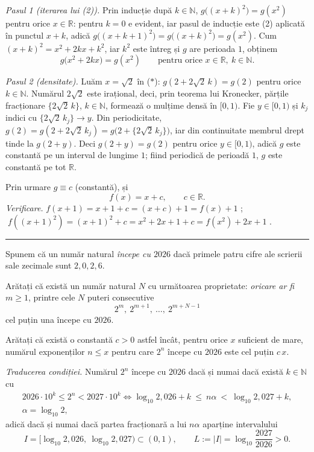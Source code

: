 \emph{Pasul 1 (iterarea lui (2)).} Prin inducție după $k\in\mathbb{N}$, $g\bigl((x+k)^2\bigr)=g(x^2)$ pentru orice $x\in\mathbb{R}$: pentru $k=0$ e evident, iar pasul de inducție este (2) aplicată în punctul $x+k$, adică $g\bigl((x+k+1)^2\bigr)=g\bigl((x+k)^2\bigr)=g(x^2)$. Cum $(x+k)^2=x^2+2kx+k^2$, iar $k^2$ este întreg și $g$ are perioada $1$, obținem
\[
g\bigl(x^2+2kx\bigr)=g(x^2)\qquad\text{pentru orice } x\in\mathbb{R},\ k\in\mathbb{N}. \tag{$*$}
\]

\emph{Pasul 2 (densitate).} Luăm $x=\sqrt2$ în ($*$): $g(2+2\sqrt2\,k)=g(2)$ pentru orice $k\in\mathbb{N}$. Numărul $2\sqrt2$ este irațional, deci, prin teorema lui Kronecker, părțile fracționare $\{2\sqrt2\,k\}$, $k\in\mathbb{N}$, formează o mulțime densă în $[0,1)$. Fie $y\in[0,1)$ și $k_j$ indici cu $\{2\sqrt2\,k_j\}\to y$. Din periodicitate, $g(2)=g(2+2\sqrt2\,k_j)=g\bigl(2+\{2\sqrt2\,k_j\}\bigr)$, iar din continuitate membrul drept tinde la $g(2+y)$. Deci $g(2+y)=g(2)$ pentru orice $y\in[0,1)$, adică $g$ este constantă pe un interval de lungime $1$; fiind periodică de perioadă $1$, $g$ este constantă pe tot $\mathbb{R}$.

Prin urmare $g\equiv c$ (constantă), și
\[
\boxed{f(x)=x+c,\qquad c\in\mathbb{R}.}
\]
\emph{Verificare.} $f(x+1)=x+1+c=(x+c)+1=f(x)+1$ \checkmark; $\;f((x+1)^2)=(x+1)^2+c=x^2+2x+1+c=f(x^2)+2x+1$ \checkmark.
\vspace{1mm}\hrule

Spunem că un număr natural \emph{începe cu $2026$} dacă primele patru cifre ale scrierii sale zecimale sunt $2,0,2,6$.
\begin{parti}
  \item Arătați că există un număr natural $N$ cu următoarea proprietate: \emph{oricare ar fi} $m\ge1$, printre cele $N$ puteri consecutive
  \[ 2^{m},\ 2^{m+1},\ \dots,\ 2^{m+N-1} \]
  cel puțin una începe cu $2026$.
  \item Arătați că există o constantă $c>0$ astfel încât, pentru orice $x$ suficient de mare, numărul exponenților $n\le x$ pentru care $2^{n}$ începe cu $2026$ este cel puțin $c\,x$.
\end{parti}
\sol \emph{Traducerea condiției.} Numărul $2^{n}$ începe cu $2026$ dacă și numai dacă există $k\in\mathbb{N}$ cu
\[ \begin{gathered} 2026\cdot10^{k}\le2^{n}<2027\cdot10^{k} \iff \log_{10}2{,}026+k\ \le\ n\alpha\ <\ \log_{10}2{,}027+k ,\\ \alpha=\log_{10}2 , \end{gathered} \]
adică dacă și numai dacă partea fracționară a lui $n\alpha$ aparține intervalului
\[ I=\bigl[\log_{10}2{,}026,\ \log_{10}2{,}027\bigr)\subset(0,1),\qquad L:=|I|=\log_{10}\frac{2027}{2026}>0 . \]


